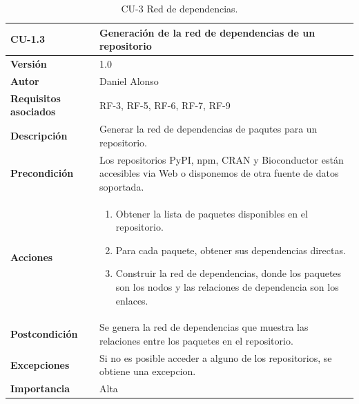 \begin{table}[p]
	\centering
	\begin{tabularx}{\linewidth}{ p{} p{} }
		\toprule
		\textbf{CU-1.3}                 & \textbf{Generación de la red de dependencias de un repositorio}                                                          \\
		\toprule
		\textbf{Versión}              & 1.0                                                                                                                      \\
		\textbf{Autor}                & Daniel Alonso                                                                                                            \\
		\textbf{Requisitos asociados} & RF-3, RF-5, RF-6, RF-7, RF-9                                                                                             \\
		\textbf{Descripción}          & Generar la red de dependencias de paqutes para un repositorio.                                                           \\
		\textbf{Precondición}         & Los repositorios PyPI, npm, CRAN y Bioconductor están accesibles via Web o disponemos de otra fuente de datos soportada. \\
		\textbf{Acciones}             &
		\begin{enumerate}
			\def\labelenumi{\arabic{enumi}.}
			\tightlist
			\item Obtener la lista de paquetes disponibles en el repositorio.
			\item Para cada paquete, obtener sus dependencias directas.
			\item Construir la red de dependencias, donde los paquetes son los nodos y las relaciones de dependencia son los enlaces.
		\end{enumerate}                                 \\
		\textbf{Postcondición}        & Se genera la red de dependencias que muestra las relaciones entre los paquetes en el repositorio.                        \\
		\textbf{Excepciones}          & Si no es posible acceder a alguno de los repositorios, se obtiene una excepcion.                                         \\
		\textbf{Importancia}          & Alta                                                                                                                     \\
		\bottomrule
	\end{tabularx}
	\caption{CU-3 Red de dependencias.}
	\label{tab:cu3}
\end{table}

